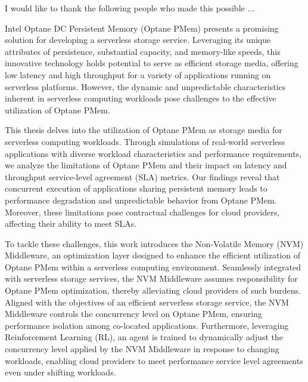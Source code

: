 \documentclass[11pt]{report}
\begin{document}
\acknowledgementspage

\noindent I would like to thank the following people who made this possible ...


\tableofcontents

\listoftables

\listoffigures

\abstractpage

Intel Optane DC Persistent Memory (Optane PMem) presents a promising solution for developing a serverless storage service. Leveraging its unique attributes of persistence, substantial capacity, and memory-like speeds, this innovative technology holds potential to serve as efficient storage media, offering low latency and high throughput for a variety of applications running on serverless platforms. However, the dynamic and unpredictable characteristics inherent in serverless computing workloads pose challenges to the effective utilization of Optane PMem.

This thesis delves into the utilization of Optane PMem as storage media for serverless computing workloads. Through simulations of real-world serverless applications with diverse workload characteristics and performance requirements, we analyze the limitations of Optane PMem and their impact on latency and throughput service-level agreement (SLA) metrics. Our findings reveal that concurrent execution of applications sharing persistent memory leads to performance degradation and unpredictable behavior from Optane PMem. Moreover, these limitations pose contractual challenges for cloud providers, affecting their ability to meet SLAs.

To tackle these challenges, this work introduces the Non-Volatile Memory (NVM) Middleware, an optimization layer designed to enhance the efficient utilization of Optane PMem within a serverless computing environment. Seamlessly integrated with serverless storage services, the NVM Middleware assumes responsibility for Optane PMem optimization, thereby alleviating cloud providers of such burdens. Aligned with the objectives of an efficient serverless storage service, the NVM Middleware controls the concurrency level on Optane PMem, ensuring performance isolation among co-located applications. Furthermore, leveraging Reinforcement Learning (RL), an agent is trained to dynamically adjust the concurrency level applied by the NVM Middleware in response to changing workloads, enabling cloud providers to meet performance service level agreements even under shifting workloads.
\end{document}
